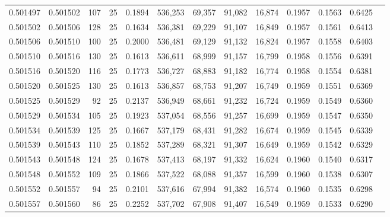 \begin{tabular}{rrrrrrrrrrrrr}
0.501497 & 0.501502 & 107 &  25 &                                     0.1894 & 536,253 &  69,357 &  91,082 &  16,874 & 0.1957 & 0.1563 & 0.6425 \\
0.501502 & 0.501506 & 128 &  25 &                                     0.1634 & 536,381 &  69,229 &  91,107 &  16,849 & 0.1957 & 0.1561 & 0.6413 \\
0.501506 & 0.501510 & 100 &  25 &                                     0.2000 & 536,481 &  69,129 &  91,132 &  16,824 & 0.1957 & 0.1558 & 0.6403 \\
0.501510 & 0.501516 & 130 &  25 &                                     0.1613 & 536,611 &  68,999 &  91,157 &  16,799 & 0.1958 & 0.1556 & 0.6391 \\
0.501516 & 0.501520 & 116 &  25 &                                     0.1773 & 536,727 &  68,883 &  91,182 &  16,774 & 0.1958 & 0.1554 & 0.6381 \\
0.501520 & 0.501525 & 130 &  25 &                                     0.1613 & 536,857 &  68,753 &  91,207 &  16,749 & 0.1959 & 0.1551 & 0.6369 \\
0.501525 & 0.501529 &  92 &  25 &                                     0.2137 & 536,949 &  68,661 &  91,232 &  16,724 & 0.1959 & 0.1549 & 0.6360 \\
0.501529 & 0.501534 & 105 &  25 &                                     0.1923 & 537,054 &  68,556 &  91,257 &  16,699 & 0.1959 & 0.1547 & 0.6350 \\
0.501534 & 0.501539 & 125 &  25 &                                     0.1667 & 537,179 &  68,431 &  91,282 &  16,674 & 0.1959 & 0.1545 & 0.6339 \\
0.501539 & 0.501543 & 110 &  25 &                                     0.1852 & 537,289 &  68,321 &  91,307 &  16,649 & 0.1959 & 0.1542 & 0.6329 \\
0.501543 & 0.501548 & 124 &  25 &                                     0.1678 & 537,413 &  68,197 &  91,332 &  16,624 & 0.1960 & 0.1540 & 0.6317 \\
0.501548 & 0.501552 & 109 &  25 &                                     0.1866 & 537,522 &  68,088 &  91,357 &  16,599 & 0.1960 & 0.1538 & 0.6307 \\
0.501552 & 0.501557 &  94 &  25 &                                     0.2101 & 537,616 &  67,994 &  91,382 &  16,574 & 0.1960 & 0.1535 & 0.6298 \\
0.501557 & 0.501560 &  86 &  25 &                                     0.2252 & 537,702 &  67,908 &  91,407 &  16,549 & 0.1959 & 0.1533 & 0.6290 \\

\end{tabular}
